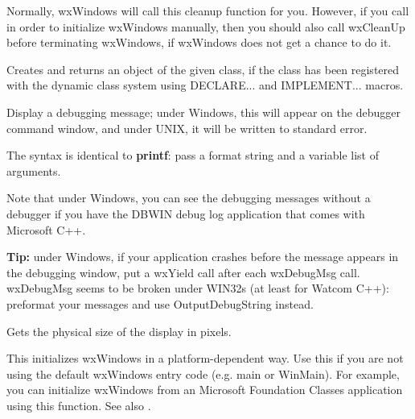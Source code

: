 Normally, wxWindows will call this cleanup function for you. However, if
you call  in order to initialize wxWindows
manually, then you should also call wxCleanUp before terminating wxWindows,
if wxWindows does not get a chance to do it.

\label{wxcreatedynamicobject}


Creates and returns an object of the given class, if the class has been
registered with the dynamic class system using DECLARE... and IMPLEMENT... macros.



Display a debugging message; under Windows, this will appear on the
debugger command window, and under UNIX, it will be written to standard
error.

The syntax is identical to {\bf printf}: pass a format string and a
variable list of arguments.

Note that under Windows, you can see the debugging messages without a
debugger if you have the DBWIN debug log application that comes with
Microsoft C++.

{\bf Tip:} under Windows, if your application crashes before the
message appears in the debugging window, put a wxYield call after
each wxDebugMsg call. wxDebugMsg seems to be broken under WIN32s
(at least for Watcom C++): preformat your messages and use OutputDebugString
instead.



Gets the physical size of the display in pixels.

\label{wxentry}

This initializes wxWindows in a platform-dependent way. Use this if you
are not using the default wxWindows entry code (e.g. main or WinMain). For example,
you can initialize wxWindows from an Microsoft Foundation Classes application using
this function. See also .

 
